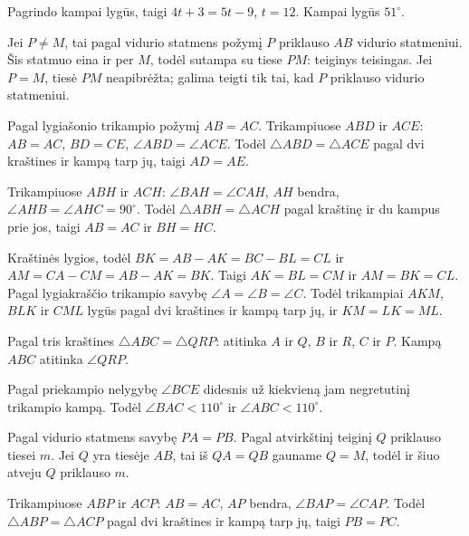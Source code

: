 \documentclass[12pt,a4paper,reqno]{amsart}
\theoremstyle{plain}\newtheorem{theorem}{Teorema}[section]
\theoremstyle{definition}
\theoremstyle{remark}\newtheorem{remark}[theorem]{Pastaba}\newtheorem*{remark*}{Pastaba}
\theoremstyle{definition}\newtheorem*{problem*}{Uždavinys}
\begin{document}
\begin{solution}[\ref{uzd:savikontrole-02}] Pagrindo kampai lygūs, taigi $4t+3=5t-9$, $t=12$. Kampai lygūs $51^\circ$. \end{solution}
\begin{solution}[\ref{uzd:savikontrole-03}] Jei $P\ne M$, tai pagal vidurio statmens požymį $P$ priklauso $AB$ vidurio statmeniui. Šis statmuo eina ir per $M$, todėl sutampa su tiese $PM$: teiginys teisingas. Jei $P=M$, tiesė $PM$ neapibrėžta; galima teigti tik tai, kad $P$ priklauso vidurio statmeniui. \end{solution}
\begin{solution}[\ref{uzd:savikontrole-04}] Pagal lygiašonio trikampio požymį $AB=AC$. Trikampiuose $ABD$ ir $ACE$: $AB=AC$, $BD=CE$, $\angle ABD=\angle ACE$. Todėl $\triangle ABD=\triangle ACE$ pagal dvi kraštines ir kampą tarp jų, taigi $AD=AE$. \end{solution}
\begin{solution}[\ref{uzd:savikontrole-05}] Trikampiuose $ABH$ ir $ACH$: $\angle BAH=\angle CAH$, $AH$ bendra, $\angle AHB=\angle AHC=90^\circ$. Todėl $\triangle ABH=\triangle ACH$ pagal kraštinę ir du kampus prie jos, taigi $AB=AC$ ir $BH=HC$. \end{solution}
\begin{solution}[\ref{uzd:savikontrole-06}] Kraštinės lygios, todėl $BK=AB-AK=BC-BL=CL$ ir $AM=CA-CM=AB-AK=BK$. Taigi $AK=BL=CM$ ir $AM=BK=CL$. Pagal lygiakraščio trikampio savybę $\angle A=\angle B=\angle C$. Todėl trikampiai $AKM$, $BLK$ ir $CML$ lygūs pagal dvi kraštines ir kampą tarp jų, ir $KM=LK=ML$. \end{solution}
\begin{solution}[\ref{uzd:savikontrole-07}] Pagal tris kraštines $\triangle ABC=\triangle QRP$: atitinka $A$ ir $Q$, $B$ ir $R$, $C$ ir $P$. Kampą $ABC$ atitinka $\angle QRP$. \end{solution}
\begin{solution}[\ref{uzd:savikontrole-08}] Pagal priekampio nelygybę $\angle BCE$ didesnis už kiekvieną jam negretutinį trikampio kampą. Todėl $\angle BAC<110^\circ$ ir $\angle ABC<110^\circ$. \end{solution}
\begin{solution}[\ref{uzd:savikontrole-09}] Pagal vidurio statmens savybę $PA=PB$. Pagal atvirkštinį teiginį $Q$ priklauso tiesei $m$. Jei $Q$ yra tiesėje $AB$, tai iš $QA=QB$ gauname $Q=M$, todėl ir šiuo atveju $Q$ priklauso $m$. \end{solution}
\begin{solution}[\ref{uzd:savikontrole-10}] Trikampiuose $ABP$ ir $ACP$: $AB=AC$, $AP$ bendra, $\angle BAP=\angle CAP$. Todėl $\triangle ABP=\triangle ACP$ pagal dvi kraštines ir kampą tarp jų, taigi $PB=PC$. \end{solution}
\end{document}
